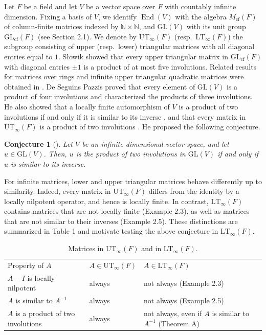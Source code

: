 \documentclass[11pt,reqno,a4paper]{amsart}
\numberwithin{equation}{section}
\theoremstyle{definition}
\theoremstyle{plain}
\newtheorem*{conjecture}{Conjecture}
\newcommand{\cf}{\mathrm{cf}}
\newcommand{\GL}{\mathrm{GL}}
\newcommand{\End}{\operatorname{End}}
\newcommand{\LT}{\mathrm{LT}_{\infty}}
\newcommand{\UT}{\mathrm{UT}_{\infty}}
\newcommand{\bbN}{\mathbb N}
\begin{document}
Let $F$ be a field and let $V$ be a vector space over $F$ with countably infinite dimension. Fixing a basis of $V$, we identify $\End(V)$ with the algebra $M_{\cf}(F)$ of column-finite matrices indexed by $\bbN\times\bbN$, and $\GL(V)$ with its unit group $\GL_{\cf}(F)$ (see Section 2.1). We denote by $\UT(F)$ (resp.\ $\LT(F)$) the subgroup consisting of upper (resp.\ lower) triangular matrices with all diagonal entries equal to $1$. S\l{}owik \cite{slowik2013} showed that every upper triangular matrix in $\GL_{\cf}(F)$ with diagonal entries $\pm1$ is a product of at most five involutions. Related results for matrices over rings and infinite upper triangular quadratic matrices were obtained in \cite{hou2017,bien2024}. De Seguins Pazzis \cite{pazzis2021} proved that every element of $\GL(V)$ is a product of four involutions and characterized the products of three involutions. He also showed that a locally finite automorphism of $V$ is a product of two involutions if and only if it is similar to its inverse \cite[Theorem 1.5]{pazzis2022}, and that every matrix in $\UT(F)$ is a product of two involutions \cite[Theorem 1.9]{pazzis2022}. He proposed the following conjecture.

\begin{conjecture}[{\cite[Conjecture 2]{pazzis2022}}]
Let $V$ be an infinite-dimensional vector space, and let $u\in\GL(V)$. Then, $u$ is the product of two involutions in $\GL(V)$ if and only if $u$ is similar to its inverse.
\end{conjecture}

For infinite matrices, lower and upper triangular matrices behave differently up to similarity. Indeed, every matrix in $\UT(F)$ differs from the identity by a locally nilpotent operator, and hence is locally finite. In contrast, $\LT(F)$ contains matrices that are not locally finite (Example 2.3), as well as matrices that are not similar to their inverses (Example 2.5). These distinctions are summarized in Table 1 and motivate testing the above conjecture in $\LT(F)$.

\begin{table}[ht]
\centering
\caption{Matrices in $\UT(F)$ and in $\LT(F)$.}
\label{tab:comparison}
\small
\begin{tabular}{@{}p{}p{}p{}@{}}
Property of $A$ & $A\in\UT(F)$ & $A\in\LT(F)$ \\[2pt]
$A-I$ is locally nilpotent & always & not always (Example 2.3) \\[2pt]
$A$ is similar to $A^{-1}$ & always & not always (Example 2.5) \\[2pt]
$A$ is a product of two involutions & always \cite[Theorem 1.9]{pazzis2022} & not always, even if $A$ is similar to $A^{-1}$ (Theorem A)
\end{tabular}
\end{table}
\end{document}
